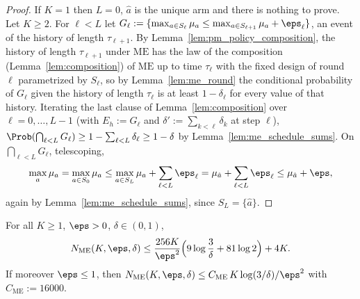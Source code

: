 \begin{proof}
\leanok
{}
If $K = 1$ then $L = 0$, $\hat a$ is the unique arm and there is nothing to prove. Let $K\ge2$.
For $\ell<L$ let $G_\ell := \{\max_{a\in S_\ell}\mu_a\le\max_{a\in S_{\ell+1}}\mu_a+\eps_\ell\}$,
an event of the history of length $\tau_{\ell+1}$. By Lemma~\ref{lem:pm_policy_composition},
the history of length $\tau_{\ell+1}$ under $\mathrm{ME}$ has the law of the composition
(Lemma~\ref{lem:composition}) of $\mathrm{ME}$ up to time $\tau_\ell$ with the fixed design
of round $\ell$ parametrized by $S_\ell$, so by Lemma~\ref{lem:me_round} the conditional
probability of $G_\ell$ given the history of length $\tau_\ell$ is at least $1-\delta_\ell$
for every value of that history.
Iterating the last clause of Lemma~\ref{lem:composition} over $\ell = 0,\dots,L-1$ (with
$E_h := G_\ell$ and $\delta' := \sum_{k<\ell}\delta_k$ at step $\ell$),
$\Prob(\bigcap_{\ell<L}G_\ell)\ge1-\sum_{\ell<L}\delta_\ell\ge1-\delta$ by
Lemma~\ref{lem:me_schedule_sums}. On $\bigcap_{\ell<L}G_\ell$, telescoping,
\[
  \max_{a}\mu_a = \max_{a\in S_0}\mu_a\le\max_{a\in S_L}\mu_a+\sum_{\ell<L}\eps_\ell
  = \mu_{\hat a}+\sum_{\ell<L}\eps_\ell\le\mu_{\hat a}+\eps ,
\]
again by Lemma~\ref{lem:me_schedule_sums}, since $S_L = \{\hat a\}$.
\end{proof}

\begin{lemma}\label{lem:me_budget}
\leanok
{}
For all $K\ge1$, $\eps>0$, $\delta\in(0,1)$,
\[
  N_{\mathrm{ME}}(K,\eps,\delta)\le\frac{256K}{\eps^2}\Big(9\log\frac3\delta+81\log2\Big)+4K .
\]
If moreover $\eps\le1$, then $N_{\mathrm{ME}}(K,\eps,\delta)\le C_{\mathrm{ME}}\,K\log(3/\delta)/\eps^2$
with $C_{\mathrm{ME}} := 16000$.
\end{lemma}

